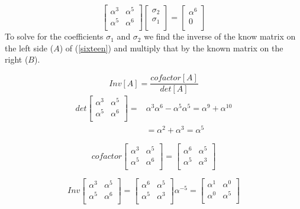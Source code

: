 \documentclass[fontsize=12pt]{article}
\begin{document}
\begin{equation}
\begin{bmatrix}
    \alpha^3       & \alpha^5 \\
    \alpha^5      &  \alpha^6 \\
\end{bmatrix}
\begin{bmatrix}
    \sigma_{2}\\
    \sigma_{1}\\
   \end{bmatrix}
=
\begin{bmatrix}
     \alpha^6\\
    0\\
\end{bmatrix}
\label{nineteen}
\end{equation}
 To solve for the coefficients $\sigma_1$ and $\sigma_2$ we find the inverse of the know matrix on the left side ($A$) of (\ref{sixteen}) and multiply that by the known matrix on the right ($B$).
 
 $$Inv [A] = \frac{cofactor[A]}{det[A]}$$
\begin{equation} 
\begin{split}
det\begin{bmatrix}
    \alpha^3       & \alpha^5 \\
    \alpha^5      &  \alpha^6 \\
\end{bmatrix}=&\alpha^3\alpha^6 - \alpha^5\alpha^5 =\alpha^9 +\alpha^{10}\\
&=\alpha^2 +\alpha^3 =\alpha^5
\end{split}
\end{equation}

\begin{equation}
cofactor
\begin{bmatrix}
    \alpha^3       & \alpha^5 \\
    \alpha^5      &  \alpha^6 \\
\end{bmatrix}
=
\begin{bmatrix}
    \alpha^6       & \alpha^5 \\
    \alpha^5      &  \alpha^3 \\
\end{bmatrix}
\end{equation}


\begin{equation}
Inv
\begin{bmatrix}
    \alpha^3       & \alpha^5 \\
    \alpha^5      &  \alpha^6 \\
\end{bmatrix}
=
\begin{bmatrix}
    \alpha^6       & \alpha^5 \\
    \alpha^5      &  \alpha^3 \\
\end{bmatrix}
\alpha^{-5}=
\begin{bmatrix}
    \alpha^1       & \alpha^0 \\
    \alpha^0      &  \alpha^5 \\
\end{bmatrix}
\end{equation}
\end{document}
